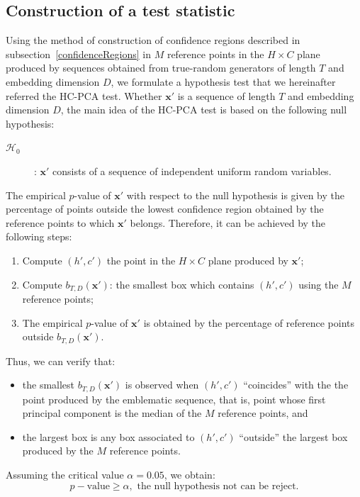 \subsection{Construction of a test statistic}\label{test}

Using the method of construction of confidence regions described in subsection~\ref{confidenceRegions} in $M$ reference points in the $H \times C$ plane produced by sequences obtained from true-random generators of length $T$ and embedding dimension $D$, we formulate a hypothesis test that we hereinafter referred the HC-PCA test.
Whether $\bm x'$ is a sequence of length $T$ and embedding dimension $D$, the  main idea of the HC-PCA test is based on the following null hypothesis:
\begin{description}
    \item[$\mathcal{H}_0$]: $\bm x'$ consists of a sequence of independent uniform random variables.
\end{description}
The empirical $p$-value of $\bm x'$ with respect to the null hypothesis is given by the percentage of points outside the lowest confidence region obtained by the reference points to which $\bm x'$ belongs.
Therefore, it can be achieved by the following steps:
\begin{enumerate}
    \item Compute $(h',c')$ the point in the $H\times C$ plane produced by $\bm x'$;
    \item Compute $b_{T,D}(\bm x')$: the smallest box which contains $(h',c')$ using the $M$ reference points;
    \item The empirical $p$-value of $\bm x'$ is obtained by the percentage of reference points outside $b_{T,D}(\bm x')$.
\end{enumerate}
Thus, we can verify that:
\begin{itemize}
    \item the smallest $b_{T,D}(\bm x')$ is observed when $(h',c')$ ``coincides'' with the the point produced by the emblematic sequence, that is, point whose first principal component is the median of the $M$ reference points, and
    \item the largest box is any box associated to $(h',c')$ ``outside'' the largest box produced by the $M$ reference points.
\end{itemize}
Assuming the critical value $\alpha = 0.05$, we obtain:
\begin{equation*}
    p-\text{value} \geq \alpha, \text{ the null hypothesis not can be reject}.
\end{equation*}